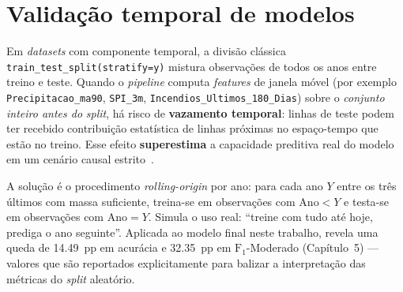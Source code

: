 \section{Validação temporal de modelos}
\label{sec:fund_validacao_temporal}

Em \emph{datasets} com componente temporal, a divisão clássica \texttt{train\_test\_split(stratify=y)} mistura observações de todos os anos entre treino e teste. Quando o \emph{pipeline} computa \emph{features} de janela móvel (por exemplo \texttt{Precipitacao\_ma90}, \texttt{SPI\_3m}, \texttt{Incendios\_Ultimos\_180\_Dias}) sobre o \emph{conjunto inteiro antes do} \emph{split}, há risco de \textbf{vazamento temporal}: linhas de teste podem ter recebido contribuição estatística de linhas próximas no espaço-tempo que estão no treino. Esse efeito \textbf{superestima} a capacidade preditiva real do modelo em um cenário causal estrito~\cite{bergmeir2012cv}.

A solução é o procedimento \emph{rolling-origin} por ano: para cada ano \(Y\) entre os três últimos com massa suficiente, treina-se em observações com \(\text{Ano} < Y\) e testa-se em observações com \(\text{Ano} = Y\). Simula o uso real: ``treine com tudo até hoje, prediga o ano seguinte''. Aplicada ao modelo final neste trabalho, revela uma queda de \SI{14,49}{pp} em acurácia e \SI{32,35}{pp} em \(\text{F}_1\)-Moderado (Capítulo~5) --- valores que são reportados explicitamente para balizar a interpretação das métricas do \emph{split} aleatório.
